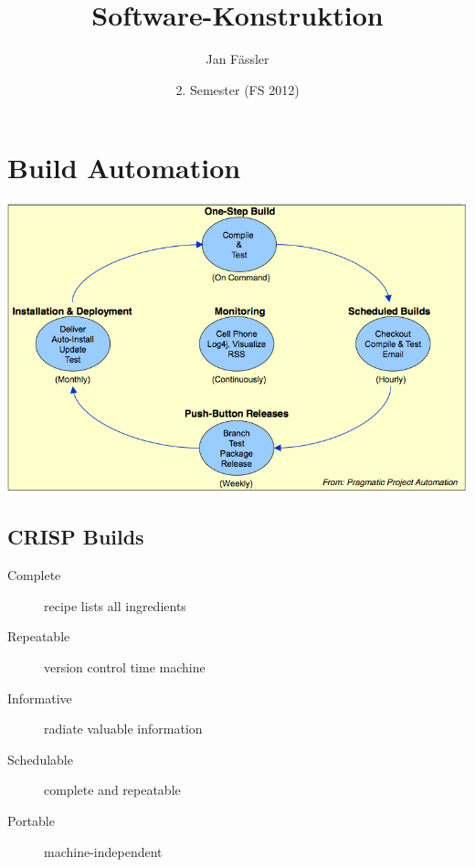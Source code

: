\documentclass[a4paper,10pt]{article}
\title{Software-Konstruktion}
\author{Jan F\"assler}
\date{2. Semester (FS 2012)}
\begin{document}
\maketitle
\newpage
\thispagestyle{fancy} %

\section{Build Automation}
\includegraphics[scale=0.6]{build_automation.png}

\subsection{CRISP Builds}
\begin{description}
	\item[Complete] recipe lists all ingredients
	\item[Repeatable] version control time machine
	\item[Informative] radiate valuable information
	\item[Schedulable] complete and repeatable
	\item[Portable] machine-independent
\end{description}
\end{document}
